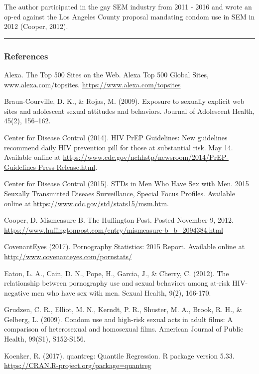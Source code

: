 \documentclass[]{article}
\begin{document}
The author participated in the gay SEM industry from 2011 - 2016 and
wrote an op-ed against the Los Angeles County proposal mandating condom
use in SEM in 2012 (Cooper, 2012).

\begin{center}\rule{0.5\linewidth}{\linethickness}\end{center}

\subsubsection{References}\label{references}

Alexa. The Top 500 Sites on the Web. Alexa Top 500 Global Sites,
www.alexa.com/topsites. \url{https://www.alexa.com/topsites}

Braun-Courville, D. K., \& Rojas, M. (2009). Exposure to sexually
explicit web sites and adolescent sexual attitudes and behaviors.
Journal of Adolescent Health, 45(2), 156--162.

Center for Disease Control (2014). HIV PrEP Guidelines: New guidelines
recommend daily HIV prevention pill for those at substantial risk. May
14. Available online at
\url{https://www.cdc.gov/nchhstp/newsroom/2014/PrEP-Guidelines-Press-Release.html}.

Center for Disease Control (2015). STDs in Men Who Have Sex with Men.
2015 Seuxally Transmitted Diseaes Surveillance, Special Focus Profiles.
Available online at \url{https://www.cdc.gov/std/stats15/msm.htm}.

Cooper, D. Mismeasure B. The Huffington Post. Posted November 9, 2012.
\url{https://www.huffingtonpost.com/entry/mismeasure-b_b_2094384.html}

CovenantEyes (2017). Pornography Statistics: 2015 Report. Available
online at \url{http://www.covenanteyes.com/pornstats/}

Eaton, L. A., Cain, D. N., Pope, H., Garcia, J., \& Cherry, C. (2012).
The relationship between pornography use and sexual behaviors among
at-risk HIV-negative men who have sex with men. Sexual Health, 9(2),
166-170.

Grudzen, C. R., Elliot, M. N., Kerndt, P. R., Shuster, M. A., Brook, R.
H., \& Gelberg, L. (2009). Condom use and high-risk sexual acts in adult
films: A comparison of heterosexual and homosexual films. American
Journal of Public Health, 99(S1), S152-S156.

Koenker, R. (2017). quantreg: Quantile Regression. R package version
5.33. \url{https://CRAN.R-project.org/package=quantreg}
\end{document}
